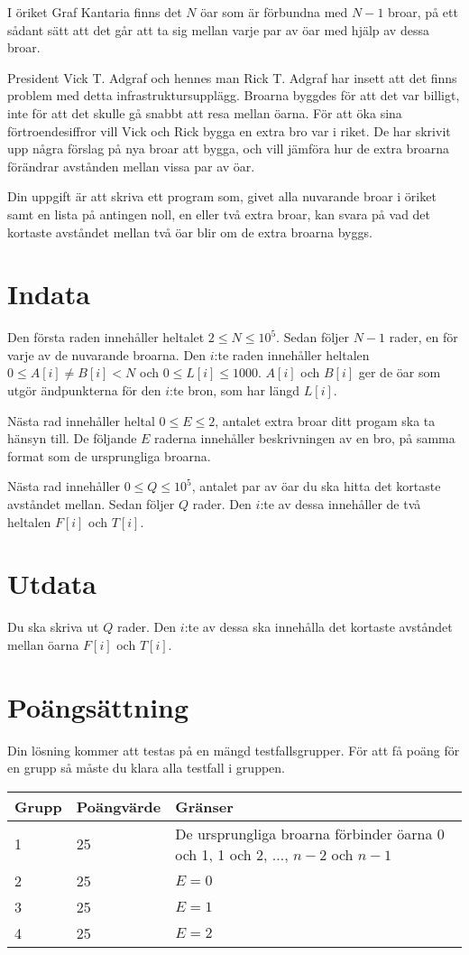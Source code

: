 I öriket Graf Kantaria finns det $N$ öar som är förbundna med $N - 1$ broar, på ett sådant sätt att det går att ta sig mellan varje par av öar med hjälp av dessa broar.

President Vick T. Adgraf och hennes man Rick T. Adgraf har insett att det finns problem med detta infrastruktursupplägg.
Broarna byggdes för att det var billigt, inte för att det skulle gå snabbt att resa mellan öarna.
För att öka sina förtroendesiffror vill Vick och Rick bygga en extra bro var i riket.
De har skrivit upp några förslag på nya broar att bygga, och vill jämföra hur de extra broarna förändrar avstånden mellan vissa par av öar.

Din uppgift är att skriva ett program som, givet alla nuvarande broar i öriket samt en lista på antingen noll, en eller två extra broar, kan svara på vad det kortaste avståndet mellan två öar blir om de extra broarna byggs.

\section*{Indata}
Den första raden innehåller heltalet $2 \le N \le 10^5$.
Sedan följer $N - 1$ rader, en för varje av de nuvarande broarna.
Den $i$:te raden innehåller heltalen $0 \le A[i] \not= B[i] < N$ och $0 \le L[i] \le 1000$.
$A[i]$ och $B[i]$ ger de öar som utgör ändpunkterna för den $i$:te bron, som har längd $L[i]$.

Nästa rad innehåller heltal $0 \le E \le 2$, antalet extra broar ditt progam ska ta hänsyn till.
De följande $E$ raderna innehåller beskrivningen av en bro, på samma format som de ursprungliga broarna.

Nästa rad innehåller $0 \le Q \le 10^5$, antalet par av öar du ska hitta det kortaste avståndet mellan.
Sedan följer $Q$ rader.
Den $i$:te av dessa innehåller de två heltalen $F[i]$ och $T[i]$.

\section*{Utdata}
Du ska skriva ut $Q$ rader.
Den $i$:te av dessa ska innehålla det kortaste avståndet mellan öarna $F[i]$ och $T[i]$.

\section*{Poängsättning}
Din lösning kommer att testas på en mängd testfallsgrupper. För att få poäng för en grupp
så måste du klara alla testfall i gruppen.

\noindent
\begin{tabular}{| l | l | l |}
\hline
Grupp & Poängvärde & Gränser \\ \hline
	1     & 25         & De ursprungliga broarna förbinder öarna 0 och 1, 1 och 2, $\dots$, $n - 2$ och $n - 1$\\ \hline
	2     & 25         & $E = 0$ \\ \hline
	3     & 25         & $E = 1$ \\ \hline
	4     & 25         & $E = 2$ \\ \hline
\end{tabular}
